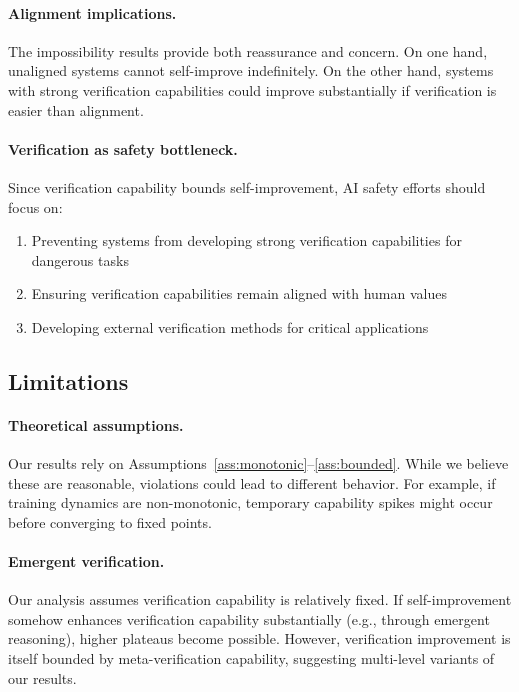 \documentclass{article}
\theoremstyle{definition}
\theoremstyle{remark}
\begin{document}
\paragraph{Alignment implications.} The impossibility results provide both reassurance and concern. On one hand, unaligned systems cannot self-improve indefinitely. On the other hand, systems with strong verification capabilities could improve substantially if verification is easier than alignment.

\paragraph{Verification as safety bottleneck.} Since verification capability bounds self-improvement, AI safety efforts should focus on:
\begin{enumerate}
\item Preventing systems from developing strong verification capabilities for dangerous tasks
\item Ensuring verification capabilities remain aligned with human values
\item Developing external verification methods for critical applications
\end{enumerate}

\subsection{Limitations}

\paragraph{Theoretical assumptions.} Our results rely on Assumptions~\ref{ass:monotonic}--\ref{ass:bounded}. While we believe these are reasonable, violations could lead to different behavior. For example, if training dynamics are non-monotonic, temporary capability spikes might occur before converging to fixed points.

\paragraph{Emergent verification.} Our analysis assumes verification capability is relatively fixed. If self-improvement somehow enhances verification capability substantially (e.g., through emergent reasoning), higher plateaus become possible. However, verification improvement is itself bounded by meta-verification capability, suggesting multi-level variants of our results.
\end{document}
